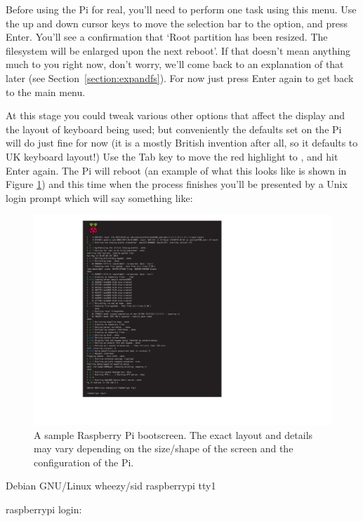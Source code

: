 Before using the Pi for real, you'll need to perform one task using this menu. Use the up and down cursor keys to move the selection bar to the  option, and press Enter. You'll see a confirmation that `Root partition has been resized. The filesystem will be enlarged upon the next reboot'. If that doesn't mean anything much to you right now, don't worry, we'll come back to an explanation of that later (see Section~\ref{section:expandfs}). For now just press Enter again to get back to the main menu. 

At this stage you could tweak various other options that affect the display and the layout of keyboard being used; but conveniently the defaults set on the Pi will do just fine for now (it is a mostly British invention after all, so it defaults to UK keyboard layout!) Use the Tab key to move the red highlight to , and hit Enter again. The Pi will reboot (an example of what this looks like is shown in Figure \ref{figure:piboot}) and this time when the process finishes you'll be presented by a Unix login prompt which will say something like:

\begin{figure}
\centerline{\includegraphics[width=15cm]{images/bootscreen}}
\caption{A sample Raspberry Pi bootscreen. The exact layout and details may vary depending on the size/shape of the screen and the configuration of the Pi.}\label{figure:piboot}
\end{figure}

\begin{ttoutenv}
Debian GNU/Linux wheezy/sid raspberrypi tty1

raspberrypi login:
\end{ttoutenv}


